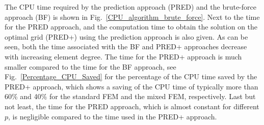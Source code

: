 \documentclass[review,3p]{elsarticle}
\begin{document}
The CPU time required by the prediction approach (PRED) and the brute-force approach (BF) is shown in Fig.~\ref{CPU_algorithm_brute_force}. Next to the time for the PRED approach, and the computation time to obtain the solution on the optimal grid (PRED+) using the prediction approach is also given.
As can be seen, both the time associated with the BF and PRED+ approaches decrease with increasing element degree. The time for the PRED+ approach is much smaller compared to the time for the BF approach, see Fig.~\ref{Percentage_CPU_Saved} for the percentage of the CPU time saved by the PRED+ approach, which shows a saving of the CPU time of typically more than 60\% and 40\% for the standard FEM and the mixed FEM, respectively. Last but not least, the time for the PRED approach, which is almost constant for different $p$, is negligible compared to the time used in the PRED+ approach.
\end{document}
